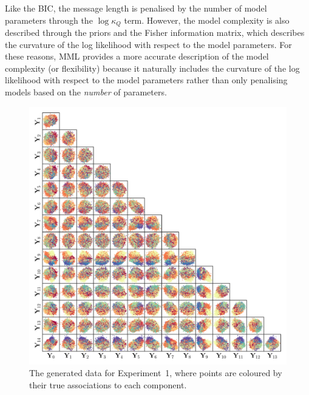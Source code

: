 \documentclass[twocolumn]{aastex62}
\newcommand{\todo}[1]{\textcolor{red}{#1}}
\begin{document}
Like the BIC, the message length is penalised by the number of model parameters
through the $\log\kappa_Q$ term. However, the model complexity is also 
described through the priors and the Fisher information matrix, which
describes the curvature of the log likelihood with respect to the model
parameters. For these reasons, MML provides a more accurate description of
the model complexity (or flexibility) because it naturally includes the 
curvature of the log likelihood with respect to the model parameters
rather than only penalising models based on the \emph{number} of
parameters.


\begin{figure}
	\includegraphics[width=1.0\textwidth]{experiments/exp1-data-colour.pdf}
    \caption{The generated data for Experiment~1, where points are coloured by their
		     true associations to each component.}
    \label{fig:exp1-data}
\end{figure}
\end{document}

